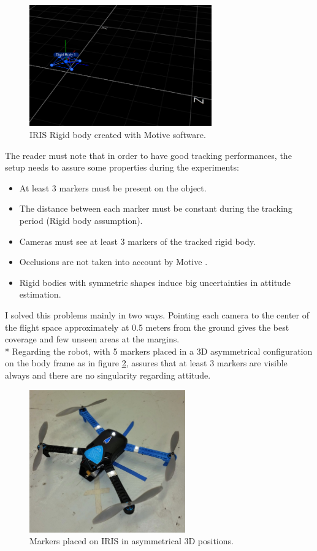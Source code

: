 \begin{figure}[h]
\centering
 \includegraphics[width=0.7\textwidth]{motiv_iris.PNG}
 \caption[IRIS Rigid body]{IRIS Rigid body created with Motive software.}
 \label{figure:motivescreen}
\end{figure}
The reader must note that in order to have good tracking performances, the setup needs to assure some properties during the experiments:

\begin{itemize}
\item At least 3 markers must be present on the object.
\item The distance between each marker must be constant during the tracking period (Rigid body assumption).
\item Cameras must see at least 3 markers of the tracked rigid body.
\item Occlusions are not taken into account by Motive \cite{OptiT}.
\item Rigid bodies with symmetric shapes induce big uncertainties in attitude estimation.
\end{itemize}
I solved this problems mainly in two ways. Pointing each camera to the center of the flight space approximately at 0.5 meters from the ground gives the best coverage and few unseen areas at the margins.\\*
Regarding the robot, with 5 markers placed in a 3D asymmetrical configuration  on the body frame as in figure \ref{figure:markedIRIS}, assures that at least 3 markers are visible always and there are no singularity regarding attitude.

\begin{figure}[h]
\centering
 \includegraphics[width=0.6\textwidth]{irismarker.jpg}
 \caption[Marker placement on IRIS]{Markers placed on IRIS in asymmetrical 3D positions.}
 \label{figure:markedIRIS}
\end{figure}



